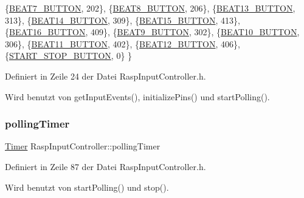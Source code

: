 \begin{DoxyCode}
            \{\hyperlink{namespaceinputs_ac74e302394a578b31f0cf44df8cbb1a9}{BEAT7\_BUTTON},           202\},
            \{\hyperlink{namespaceinputs_abfcd4d28221c436391131a27402ea620}{BEAT8\_BUTTON},           206\},
            \{\hyperlink{namespaceinputs_a8f9d547eaa8c52cebfa64221341f266a}{BEAT13\_BUTTON},          313\},
            \{\hyperlink{namespaceinputs_a4dfd34a5656f72c71f1b2dd8efc963dc}{BEAT14\_BUTTON},          309\},
            \{\hyperlink{namespaceinputs_a1952aa2d27b65c8d8899a1ae1cfb7bb9}{BEAT15\_BUTTON},          413\},
            \{\hyperlink{namespaceinputs_af0f3099a06352ba4eb0808091b908178}{BEAT16\_BUTTON},          409\},
            \{\hyperlink{namespaceinputs_af628ea84bf7114a62249d4bb425ed06a}{BEAT9\_BUTTON},           302\},
            \{\hyperlink{namespaceinputs_a9778bcf3a44a9d16ae156bac6d745a24}{BEAT10\_BUTTON},          306\},
            \{\hyperlink{namespaceinputs_ad09e4010a8b08721988599b198645372}{BEAT11\_BUTTON},          402\},
            \{\hyperlink{namespaceinputs_a7b6bb44b9241cac31ff9909c3fc88271}{BEAT12\_BUTTON},          406\},
            \{\hyperlink{namespaceinputs_ab1d04ae8b7a7f4d11849c110f20fae10}{START\_STOP\_BUTTON},      0\}
    \}
\end{DoxyCode}


Definiert in Zeile 24 der Datei Rasp\+Input\+Controller.\+h.



Wird benutzt von get\+Input\+Events(), initialize\+Pins() und start\+Polling().

\mbox{\label{class_rasp_input_controller_a388779c1ddf9f5910a92cd350cc59e5c}} 
\subsubsection{\texorpdfstring{polling\+Timer}{pollingTimer}}
{\footnotesize\ttfamily \hyperlink{class_timer}{Timer} Rasp\+Input\+Controller\+::polling\+Timer\hspace{0.3cm}{\ttfamily [private]}}



Definiert in Zeile 87 der Datei Rasp\+Input\+Controller.\+h.



Wird benutzt von start\+Polling() und stop().

